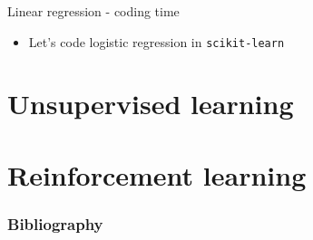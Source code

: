 \documentclass[aspectratio=169]{beamer}
\begin{document}
\begin{frame}{Linear regression - coding time}
    \begin{itemize}
        \item Let's code logistic regression in \texttt{scikit-learn}
    \end{itemize}
\end{frame}
\section{Unsupervised learning}
\section{Reinforcement learning}

\begin{frame}[t, allowframebreaks]
\frametitle{Bibliography}


\end{frame}
\end{document}
